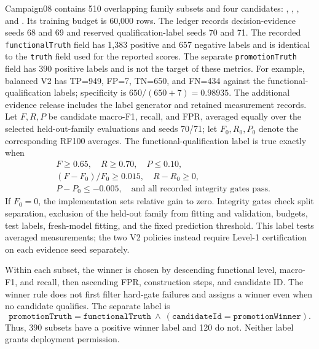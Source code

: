 \documentclass[manuscript,screen,nonacm]{acmart}
\begin{document}
Campaign08 contains 510 overlapping family subsets and four candidates:
, ,
, and
.
Its training budget is 60,000 rows. The ledger records decision-evidence
seeds 68 and 69 and reserved qualification-label seeds 70 and 71.
The recorded \mbox{\texttt{functionalTruth}} field has 1,383 positive and 657
negative labels and is identical to the \texttt{truth} field used for the
reported scores. The separate \mbox{\texttt{promotionTruth}} field has 390
positive labels and is not the target of these metrics.
For example, balanced V2 has TP=949, FP=7, TN=650, and FN=434 against
the functional-qualification labels; specificity is
$650/(650+7)=0.98935$.
The additional evidence release includes the label generator and retained
measurement records. Let $F,R,P$ be candidate macro-F1, recall, and FPR,
averaged equally over the selected held-out-family evaluations and seeds
70/71; let $F_0,R_0,P_0$ denote the corresponding RF100 averages.
The functional-qualification label is true exactly when
\begin{equation*}
\begin{aligned}
&F\geq 0.65,\quad R\geq 0.70,\quad P\leq 0.10,\\
&(F-F_0)/F_0\geq 0.015,\quad R-R_0\geq 0,\\
&P-P_0\leq -0.005,\quad \text{and all recorded integrity gates pass}.
\end{aligned}
\end{equation*}
If $F_0=0$, the implementation sets relative gain to zero.
Integrity gates check split separation, exclusion of the held-out family
from fitting and validation, budgets, test labels, fresh-model fitting,
and the fixed prediction threshold. This label tests averaged measurements;
the two V2 policies instead require Level-1 certification on each evidence seed separately.

Within each subset, the winner is chosen by descending functional level,
macro-F1, and recall, then ascending FPR, construction steps, and candidate
ID. The winner rule does not first filter hard-gate failures and assigns
a winner even when no candidate qualifies. The separate label is
\begin{equation*}
\texttt{promotionTruth}
=\texttt{functionalTruth}\ \land\
(\texttt{candidateId}=\texttt{promotionWinner}).
\end{equation*}
Thus, 390 subsets have a positive winner label and 120 do not.
Neither label grants deployment permission.
\end{document}
